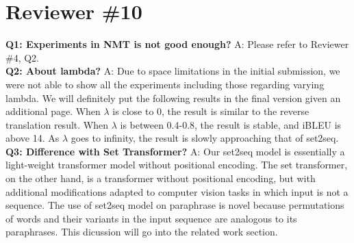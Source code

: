 \documentclass{article}
\begin{document}
\section{Reviewer \#10}
\label{sec:review2}
\textbf{Q1: Experiments in NMT is not good enough?}
A: Please refer to Reviewer \#4, Q2.\\
\textbf{Q2: About lambda?}
A: Due to space limitations in the initial submission, 
we were not able to show all the experiments 
including those regarding varying lambda. We will definitely put the following
results in the final version given an additional page.
When $\lambda$ is close to 0, the result is similar to the reverse translation 
result. When $\lambda$ is between 0.4-0.8, the result is stable, and
iBLEU is above 14. As $\lambda$ goes to infinity, the result is slowly 
approaching that of set2seq.\\
\textbf{Q3: Difference with Set Transformer?}
A: Our set2seq model is essentially a light-weight transformer model without
positional encoding. The set transformer, on the other hand, is a transformer
without positional encoding, but with additional modifications adapted to
computer vision tasks in which input is not a sequence. 
The use of set2seq model on paraphrase is novel because permutations of 
words and their variants in the input sequence are analogous to its paraphrases.
This dicussion will go into the related work section.
\end{document}
